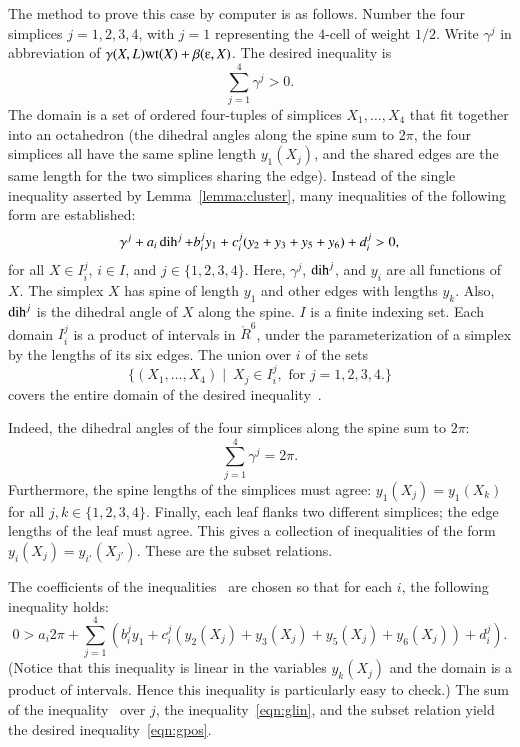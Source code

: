 The method to prove this case by computer is as follows.  Number the
four simplices $j=1,2,3,4$, with $j=1$ representing the $4$-cell of
weight $1/2$.  Write $\gamma^j$ in abbreviation of
$\gamma(X,L)\op{wt}(X) + \beta(\ee,X)$.  The desired inequality is
\begin{equation}\label{eqn:gpos} 
\sum_{j=1}^4 \gamma^j > 0.
\end{equation}
The domain is a set of ordered four-tuples of simplices
$X_1,\ldots,X_4$ that fit together into an octahedron (the dihedral
angles along the spine sum to $2\pi$, the four simplices all have the
same spline length $y_1(X_j)$, and the shared edges are the same
length for the two simplices sharing the edge).  Instead of the single
inequality asserted by Lemma~\ref{lemma:cluster}, many inequalities of
the following form are established:
\begin{equation}\label{eqn:gpart} 
\gamma^j + a_i \operatorname{dih}^j + b_i^j y_1 + c_i^j (y_2+y_3+y_5+y_6) + d_i^j > 0, 
\end{equation}
for all $X \in I_i^j$, \quad $i \in I$, and $j\in \{1,2,3,4\}$.  Here,
$\gamma^j$, $\operatorname{dih}^j$, and $y_i$ are all functions of $X$.  The simplex
$X$ has spine of length $y_1$ and other edges with lengths $y_k$.
Also, $\operatorname{dih}^j$ is the dihedral angle of $X$ along the spine.  $I$ is a
finite indexing set.  Each domain $I_i^j$ is a product of intervals in
$\ring{R}^6$, under the parameterization of a simplex by the lengths
of its six edges.  The union over $i$ of the sets
\begin{displaymath} 
\{(X_1,\ldots,X_4)\mid~ X_j \in I_i^j,\text{ for } j=1,2,3,4.\}
\end{displaymath}
covers the entire domain of the desired inequality~.   

  Indeed, the
dihedral angles of the four simplices along the spine sum to $2\pi$:
\begin{displaymath} 
\sum_{j=1}^4 \gamma^j = 2\pi.
\end{displaymath}
Furthermore, the spine lengths of the simplices must agree: $y_1(X_j)
= y_1(X_k)$ for all $j,k\in\{1,2,3,4\}$.  Finally, each leaf flanks
two different simplices; the edge lengths of the leaf must agree.
This gives a collection of inequalities of the form $y_i(X_j) =
y_{i'}(X_{j'})$.  These are the subset relations.

The coefficients of the inequalities~
are chosen so that for each $i$, the following inequality holds:
\begin{equation}\label{eqn:glin} 
0 > a_i 2\pi + 
\sum_{j=1}^4 (b_i^j y_1 +  c_i^j (y_2(X_j)+y_3(X_j)+y_5(X_j)+y_6(X_j)) + d_i^j).
\end{equation}
(Notice that this inequality is linear in the variables $y_k(X_j)$ and
the domain is a product of intervals.  Hence this inequality is
particularly easy to check.)  The sum of the
inequality~ over $j$, the inequality~\ref{eqn:glin},
and the subset relation yield the desired inequality~\ref{eqn:gpos}.

